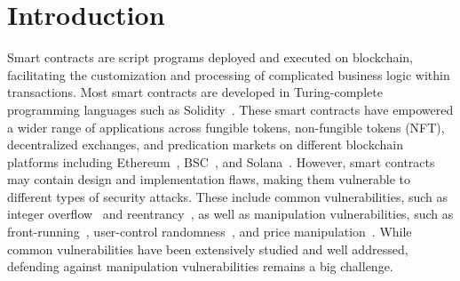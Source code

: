 \section{Introduction}
Smart contracts are script programs deployed and executed on blockchain, facilitating the customization and processing of complicated business logic within transactions.
Most smart contracts are developed in Turing-complete programming languages such as Solidity~\cite{solidity}. 
These smart contracts have empowered a wider range of applications across fungible tokens, non-fungible tokens (NFT), decentralized exchanges, and predication markets on different blockchain platforms including Ethereum~\cite{Ethereum}, BSC~\cite{bsc}, and Solana~\cite{solana}.
However, smart contracts may contain design and implementation flaws, making them vulnerable to different types of security attacks. These include common vulnerabilities, such as integer overflow~\cite{overflow} and reentrancy~\cite{reentrancy}, as well as manipulation vulnerabilities, such as  front-running~\cite{frontrunning}, user-control randomness~\cite{randomness}, and price manipulation~\cite{manipulation}. 
{While common vulnerabilities have been extensively studied and well addressed, defending against manipulation vulnerabilities remains a big challenge. }


